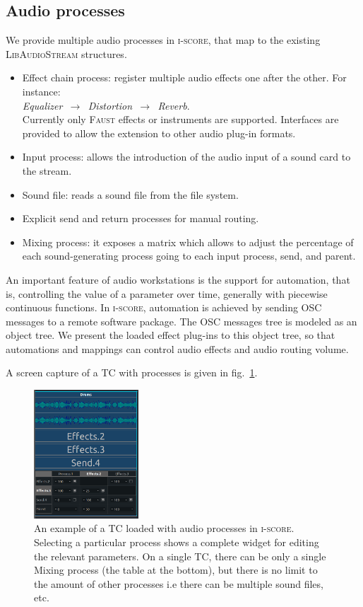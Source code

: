 \documentclass{article}
\newcommand*{\LibAudioStream}{\textsc{LibAudioStream}\xspace}
\newcommand*{\iscore}{\textsc{i-score}\xspace}
\newcommand*{\faust}{\textsc{Faust}\xspace}
\newcommand*{\timeconstraint}{\ac{TC}\xspace}
\begin{document}
\subsection{Audio processes}
\label{sec.processes}
We provide multiple audio processes in \iscore, that map 
to the existing \LibAudioStream structures.

\begin{itemize}
	\item Effect chain process: register multiple audio effects one after the other. 
	For instance:~\\ \emph{Equalizer $\,\to\,$ Distortion $\,\to\,$ Reverb}. ~\\
	Currently only \faust effects or instruments are supported. 
    Interfaces are provided to allow the extension to other audio plug-in formats.
	\item Input process: allows the introduction of the audio input of a sound card to the stream.
	\item Sound file: reads a sound file from the file system.
	\item Explicit send and return processes for manual routing.
	\item Mixing process: it exposes a matrix which allows to adjust the percentage of each sound-generating process going to each input process, send, and parent.
\end{itemize}

An important feature of audio workstations is the support for automation, that is, 
controlling the value of a parameter over time, generally with piecewise continuous functions.
In \iscore, automation is achieved by sending OSC messages to a remote software package.
The OSC messages tree is modeled as an object tree.
We present the loaded effect plug-ins to this object tree, so that automations 
and mappings can control audio effects and audio routing volume.

A screen capture of a \timeconstraint with processes is given in fig.~\ref{fig.iscoreconstraint}.
\begin{figure}
	\centering
	\includegraphics[width=0.35\textwidth]{figures/mix.png}
	\caption{An example of a \timeconstraint loaded with audio processes in \iscore. 
		Selecting a particular process shows a complete widget for editing the relevant parameters. On a single \timeconstraint, there can be only a single Mixing process (the table at the bottom), but there is no limit to the amount of other processes i.e there can be multiple sound files, etc.}
	\label{fig.iscoreconstraint}
\end{figure}
\end{document}
